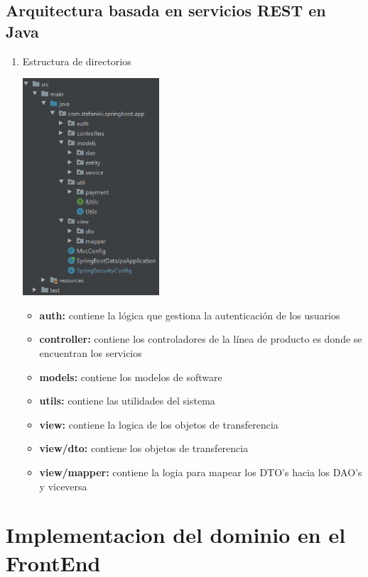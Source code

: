 \documentclass[10pt,a4paper,openany]{book}
\begin{document}
\subsection{Arquitectura basada en servicios REST en Java}

\begin{enumerate}

\item Estructura de directorios\\
\begin{center}
\includegraphics[width=0.4\textwidth]{est1}
\end{center}
\begin{itemize}
	\item \textbf{auth:} contiene la lógica que gestiona la autenticación de los usuarios
	\item \textbf{controller:} contiene los controladores de la línea de producto es donde se encuentran los servicios 
	\item \textbf{models:} contiene los modelos de software 
	\item \textbf{utils:} contiene las utilidades del sistema
	\item \textbf{view:} contiene la logica de los objetos de transferencia
	\item \textbf{view/dto:} contiene los objetos de transferencia
	\item \textbf{view/mapper:} contiene la logia para mapear los DTO's hacia los DAO's y viceversa
\end{itemize}
\end{enumerate}

\section{Implementacion del dominio en el FrontEnd}
\end{document}

